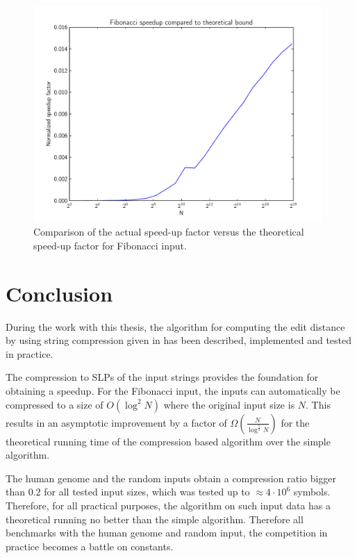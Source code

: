 \documentclass[twoside,11pt,openright]{report}
\begin{document}
\begin{figure}[!htb]
  \centering
  \includegraphics[width=11cm]{combined/simple-vs-lcs-fib}
  \caption{Comparison of the actual speed-up factor versus the theoretical speed-up factor for Fibonacci input.}
  \label{fig:benchmark:simple-vs-lcsblowup-fib}
\end{figure}
\enlargethispage{10\baselineskip}

\chapter{Conclusion}
\label{chapter:conclusion}
\enlargethispage{\baselineskip}
During the work with this thesis, the algorithm for computing the edit distance by using string compression given in \cite{Gawrychowski:2012:FAC:2422024.2422048} has been described, implemented and tested in practice.

The compression to SLPs of the input strings provides the foundation for obtaining a speedup. For the Fibonacci input, the inputs can automatically be compressed to a size of $O(\log^2{N})$ where the original input size is $N$. This results in an asymptotic improvement by a factor of $\Omega\left( \frac{N}{\log^{\frac{5}{2}}{N}} \right)$ for the theoretical running time of the compression based algorithm over the simple algorithm.

The human genome and the random inputs obtain a compression ratio bigger than $0.2$ for all tested input sizes, which was tested up to $\approx 4\cdot 10^6$ symbols. Therefore, for all practical purposes, the algorithm on such input data has a theoretical running no better than the simple algorithm. Therefore all benchmarks with the human genome and random input, the competition in practice becomes a battle on constants.
\end{document}
